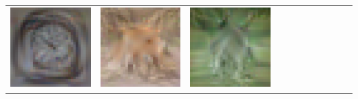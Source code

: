 {\begin{center}
\begin{tabular}{ccccccccccc}
    \includegraphics[align=c,width=\coverwidth\linewidth]{figures/cover/cifar/clock_0.pdf} &
    \includegraphics[align=c,width=\coverwidth\linewidth]{figures/cover/cifar/fox_0.pdf} &
    \includegraphics[align=c,width=\coverwidth\linewidth]{figures/cover/cifar/kangaroo_0.pdf} &

\end{tabular}
\end{center}}
